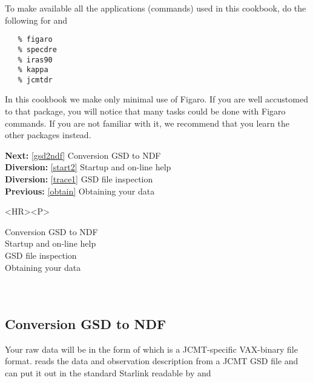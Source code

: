    To make available all the applications (commands) used in this
   cookbook, do the following
   for
   and

\begin{verbatim}
   % figaro
   % specdre
   % iras90
   % kappa
   % jcmtdr
\end{verbatim}

   In this cookbook we make only minimal use of Figaro. If you are well
   accustomed to that package, you will notice that many tasks could be done
   with Figaro commands. If you are not familiar with it, we
   recommend that you learn the other packages instead.

\begin{latexonly}
{\bf Next:} \ref{gsd2ndf} Conversion GSD to NDF\\
{\bf Diversion:} \ref{start2} Startup and on-line help\\
{\bf Diversion:} \ref{trace1} GSD file inspection\\
{\bf Previous:} \ref{obtain} Obtaining your data\\
\end{latexonly}

\begin{htmlonly}
\begin{rawhtml} <HR><P> \end{rawhtml}
{\bf {}} Conversion GSD to NDF\\
{\bf {}} Startup and on-line help\\
{\bf {}} GSD file inspection\\
{\bf {}} Obtaining your data\\
{\bf {}}\\
{\bf {}}\\
\end{htmlonly}


\subsection{\label{gsd2ndf}Conversion GSD to NDF}

   Your raw data will be in the form of
   which is a JCMT-specific VAX-binary file format.
{\tt {}}
   reads the data and observation description from a JCMT GSD file and
   can put it out in the standard Starlink
   readable by
   and

